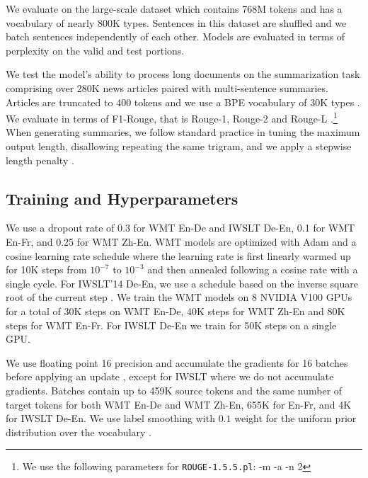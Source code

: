 We evaluate on the large-scale \gbw{} dataset \citep{chelba2013one} which contains 768M tokens and has a vocabulary of nearly 800K types. 
Sentences in this dataset are shuffled and we batch sentences independently of each other.
Models are evaluated in terms of perplexity on the valid and test portions.

We test the model's ability to process long documents on the \cnndm{} summarization task \citep{hermann15,nallapati16} comprising over 280K news articles paired with multi-sentence summaries. 
Articles are truncated to 400 tokens \citep{see17} and we use a BPE vocabulary of 30K types \citep{fan17}. 
We evaluate in terms of F1-Rouge, that is Rouge-1, Rouge-2 and Rouge-L \citep{lin04}.\footnote{We use the following parameters for \texttt{ROUGE-1.5.5.pl}: -m -a -n 2}
When generating summaries, we follow standard practice in tuning the maximum output length, disallowing repeating the same trigram, and we apply a stepwise length penalty \citep{paulus17intra,fan17,wu2016google}. 



\subsection{Training and Hyperparameters}


We use a dropout rate of 0.3 for WMT En-De and IWSLT De-En, 0.1 for WMT En-Fr, and 0.25 for WMT Zh-En. 
WMT models are optimized with Adam and a cosine learning rate schedule \citep{kingma2015adam,loshchilov2016cosine} where the learning rate is first linearly warmed up for 10K steps from $10^{-7}$ to $10^{-3}$ and then annealed following a cosine rate with a single cycle. 
For IWSLT'14 De-En, we use a schedule based on the inverse square root of the current step \citep{vaswani2017transformer}.
We train the WMT models on 8 NVIDIA V100 GPUs for a total of 30K steps on WMT En-De, 40K steps for WMT Zh-En and 80K steps for WMT En-Fr. 
For IWSLT De-En we train for 50K steps on a single GPU.

We use floating point 16 precision and accumulate the gradients for 16 batches before applying an update \citep{ott2018scaling}, except for IWSLT where we do not accumulate gradients.
Batches contain up to 459K source tokens and the same number of target tokens for both WMT En-De and WMT Zh-En, 655K for En-Fr, and 4K for IWSLT De-En.
We use label smoothing with $0.1$ weight for the uniform prior distribution over the vocabulary  \citep{szegedy2015inception,pereyra2017regularize}.


